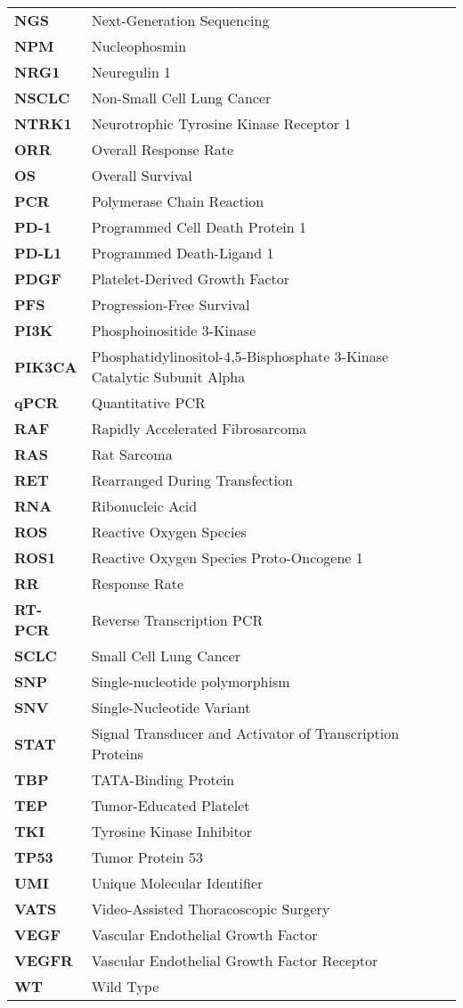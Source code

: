 \begin{longtable}[l]{l l}
    \textbf{NGS} & Next-Generation Sequencing \\
    \textbf{NPM} & Nucleophosmin \\
    \textbf{NRG1} & Neuregulin 1 \\
    \textbf{NSCLC} & Non-Small Cell Lung Cancer \\
    \textbf{NTRK1} & Neurotrophic Tyrosine Kinase Receptor 1 \\
    \textbf{ORR} &  Overall Response Rate \\
    \textbf{OS} & Overall Survival \\
    \textbf{PCR} & Polymerase Chain Reaction \\
    \textbf{PD-1} & Programmed Cell Death Protein 1 \\
    \textbf{PD-L1} & Programmed Death-Ligand 1 \\
    \textbf{PDGF} & Platelet-Derived Growth Factor \\
    \textbf{PFS} & Progression-Free Survival \\
    \textbf{PI3K} & Phosphoinositide 3-Kinase \\
    \textbf{PIK3CA} & Phosphatidylinositol-4,5-Bisphosphate 3-Kinase Catalytic Subunit Alpha \\
    \textbf{qPCR} & Quantitative PCR \\
    \textbf{RAF} & Rapidly Accelerated Fibrosarcoma \\
    \textbf{RAS} & Rat Sarcoma \\
    \textbf{RET} & Rearranged During Transfection \\
    \textbf{RNA} & Ribonucleic Acid \\
    \textbf{ROS} & Reactive Oxygen Species \\
    \textbf{ROS1} & Reactive Oxygen Species Proto-Oncogene 1 \\
    \textbf{RR} & Response Rate \\
    \textbf{RT-PCR} & Reverse Transcription PCR \\
    \textbf{SCLC} & Small Cell Lung Cancer \\
    \textbf{SNP} & Single-nucleotide polymorphism \\
    \textbf{SNV} & Single-Nucleotide Variant \\
    \textbf{STAT} & Signal Transducer and Activator of Transcription Proteins \\
    \textbf{TBP} & TATA-Binding Protein \\
    \textbf{TEP} & Tumor-Educated Platelet \\
    \textbf{TKI} & Tyrosine Kinase Inhibitor \\
    \textbf{TP53} & Tumor Protein 53 \\
    \textbf{UMI} & Unique Molecular Identifier \\
    \textbf{VATS} & Video-Assisted Thoracoscopic Surgery \\
    \textbf{VEGF} & Vascular Endothelial Growth Factor \\
    \textbf{VEGFR} & Vascular Endothelial Growth Factor Receptor \\
    \textbf{WT} & Wild Type 
\end{longtable}

\normalsize
